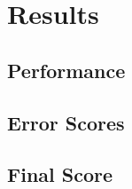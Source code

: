 \documentclass[12pt]{scrartcl}
\begin{document}
\section{Results}
\subsection{Performance}
\subsection{Error Scores}
\subsection{Final Score}




\end{document}
